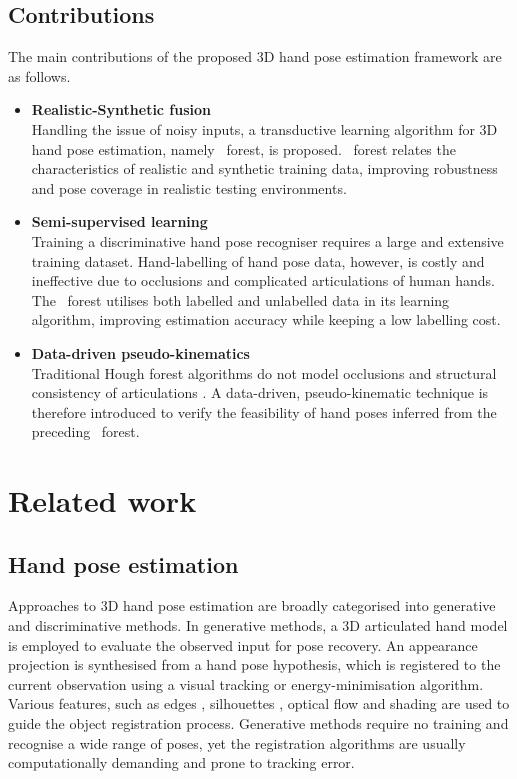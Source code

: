\subsection{Contributions} 
The main contributions of the proposed 3D hand pose estimation framework are as follows. 

\begin{itemize}
\item{\textbf{Realistic-Synthetic fusion}}\\
Handling the issue of noisy inputs, a transductive learning algorithm for 3D hand pose estimation, namely \STR\ forest, is proposed. \STR\ forest relates the characteristics of realistic and synthetic training data, improving robustness and pose coverage in realistic testing environments.
\item{\textbf{Semi-supervised learning}}\\
Training a discriminative hand pose recogniser requires a large and extensive training dataset. Hand-labelling of hand pose data, however, is costly and ineffective due to occlusions and complicated articulations of human hands. 
The \STR\ forest utilises both labelled and unlabelled data in its learning algorithm, improving estimation accuracy while keeping a low labelling cost. 
\item{\textbf{Data-driven pseudo-kinematics}}\\
	Traditional Hough forest algorithms do not model occlusions and structural consistency of articulations \cite{Gall2009}. A data-driven, pseudo-kinematic technique is therefore introduced to verify the feasibility of hand poses inferred from the preceding \STR\ forest.  
\end{itemize} 

\section{Related work}

\subsection{Hand pose estimation}

Approaches to 3D hand pose estimation are broadly categorised into generative and discriminative methods. In generative methods, a 3D articulated hand model is employed to evaluate the observed input for pose recovery. An appearance projection is synthesised from a hand pose hypothesis, which is registered to the current observation using a visual tracking or energy-minimisation algorithm. Various features, such as edges \cite{Guan2006}, silhouettes \cite{Wu2000}, optical flow \cite{Lu2003} and shading \cite{LaGorce2011} are used to guide the object registration process. Generative methods require no training and recognise a wide range of poses, yet the registration algorithms are usually computationally demanding and prone to tracking error.

